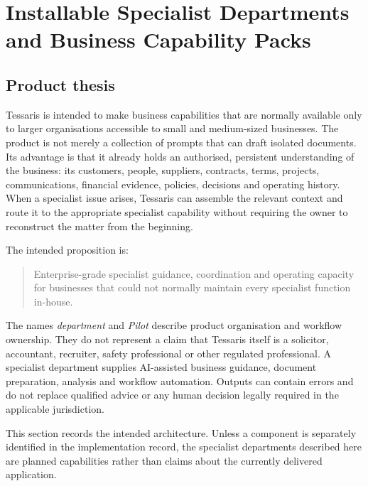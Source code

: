 
\section{Installable Specialist Departments and Business Capability Packs}
\label{sec:tessaris-specialist-departments}

\subsection{Product thesis}

Tessaris is intended to make business capabilities that are normally available
only to larger organisations accessible to small and medium-sized businesses.
The product is not merely a collection of prompts that can draft isolated
documents.  Its advantage is that it already holds an authorised, persistent
understanding of the business: its customers, people, suppliers, contracts,
terms, projects, communications, financial evidence, policies, decisions and
operating history.  When a specialist issue arises, Tessaris can assemble the
relevant context and route it to the appropriate specialist capability without
requiring the owner to reconstruct the matter from the beginning.

The intended proposition is:

\begin{quote}
Enterprise-grade specialist guidance, coordination and operating capacity for
businesses that could not normally maintain every specialist function in-house.
\end{quote}

The names \emph{department} and \emph{Pilot} describe product organisation and
workflow ownership.  They do not represent a claim that Tessaris itself is a
solicitor, accountant, recruiter, safety professional or other regulated
professional.  A specialist department supplies AI-assisted business guidance,
document preparation, analysis and workflow automation.  Outputs can contain
errors and do not replace qualified advice or any human decision legally
required in the applicable jurisdiction.

This section records the intended architecture.  Unless a component is
separately identified in the implementation record, the specialist departments
described here are planned capabilities rather than claims about the currently
delivered application.

